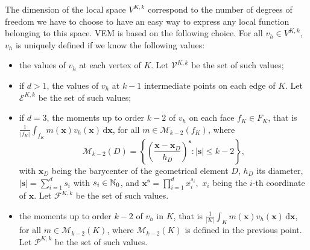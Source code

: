 The dimension of the local space $V^{K,k}$ correspond to the number of degrees of freedom we have to choose to have an easy way to express any local function belonging to this space. VEM is based on the following choice. For all $v_h\in V^{K,k}$, $v_h$ is uniquely defined if we know the following values:
\begin{itemize}
\item the values of $v_h$ at each vertex of $K$. Let $\mathcal{V}^{K,k}$ be the set of such values;
\item if $d>1$, the values of $v_h$ at $k-1$ intermediate points on each edge of $K$. Let $\mathcal{E}^{K,k}$ be the set of such values;
\item if $d=3$, the moments up to order $k-2$ of $v_h$ on each face $f_K\in F_K$, that is $\frac{1}{|f_K|}\int_{f_K}m(\mathbf{x})v_h(\mathbf{x})\, \mathrm{d}\mathbf{x}$, for all $m\in \mathcal{M}_{k-2}(f_K)$, where $$\mathcal{M}_{k-2}(D) = \left\{\left(\frac{\mathbf{x}-\mathbf{x}_D}{h_D}\right)^\mathbf{s} : |\mathbf{s}|\leq k-2\right\},$$ with $\mathbf{x}_D$ being the barycenter of the geometrical element $D$, $h_D$ its diameter, $|\mathbf{s}| = \sum_{i=1}^d s_i$ with $s_i\in \mathbb{N}_0$, and $\mathbf{x}^\mathbf{s}=\prod_{i=1}^d x_i^{s_i},$ $x_i$ being the $i$-th coordinate of $\mathbf{x}$. Let $\mathcal{F}^{K,k}$ be the set of such values.
\item the moments up to order $k-2$ of $v_h$ in $K$, that is $\frac{1}{|K|}\int_Km(\mathbf{x})v_h(\mathbf{x})\, \mathrm{d}\mathbf{x}$, for all $m\in \mathcal{M}_{k-2}(K)$, where $\mathcal{M}_{k-2}(K)$ is defined in the previous point. Let $\mathcal{P}^{K,k}$ be the set of such values.
\end{itemize}

